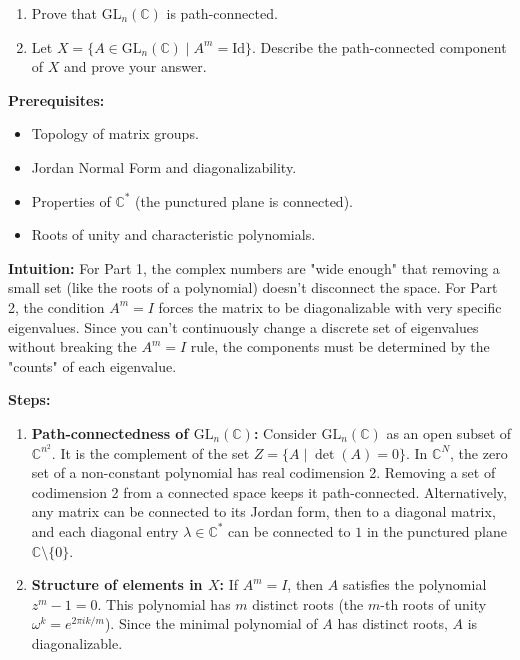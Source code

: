 \begin{exercise}
\label{algebra:2019:4}
\begin{enumerate}
    \item Prove that $\mathrm{GL}_n(\mathbb{C})$ is path-connected.
    \item Let $X = \{A \in \mathrm{GL}_n(\mathbb{C}) \mid A^m = \mathrm{Id}\}$. Describe the path-connected component of $X$ and prove your answer.
\end{enumerate}
\end{exercise}

\begin{solution}
\textbf{Prerequisites:}
\begin{itemize}
    \item Topology of matrix groups.
    \item Jordan Normal Form and diagonalizability.
    \item Properties of $\mathbb{C}^*$ (the punctured plane is connected).
    \item Roots of unity and characteristic polynomials.
\end{itemize}

\textbf{Intuition:}
For Part 1, the complex numbers are "wide enough" that removing a small set (like the roots of a polynomial) doesn't disconnect the space. For Part 2, the condition $A^m=I$ forces the matrix to be diagonalizable with very specific eigenvalues. Since you can't continuously change a discrete set of eigenvalues without breaking the $A^m=I$ rule, the components must be determined by the "counts" of each eigenvalue.

\par

\textbf{Steps:}
\begin{enumerate}
    \item \textbf{Path-connectedness of $\mathrm{GL}_n(\mathbb{C})$:} Consider $\mathrm{GL}_n(\mathbb{C})$ as an open subset of $\mathbb{C}^{n^2}$. It is the complement of the set $Z = \{A \mid \det(A) = 0\}$. In $\mathbb{C}^N$, the zero set of a non-constant polynomial has real codimension 2. Removing a set of codimension 2 from a connected space keeps it path-connected. Alternatively, any matrix can be connected to its Jordan form, then to a diagonal matrix, and each diagonal entry $\lambda \in \mathbb{C}^*$ can be connected to $1$ in the punctured plane $\mathbb{C} \setminus \{0\}$.

    \item \textbf{Structure of elements in $X$:} If $A^m = I$, then $A$ satisfies the polynomial $z^m - 1 = 0$. This polynomial has $m$ distinct roots (the $m$-th roots of unity $\omega^k = e^{2\pi i k / m}$). Since the minimal polynomial of $A$ has distinct roots, $A$ is diagonalizable.


\end{enumerate}
\end{solution}
